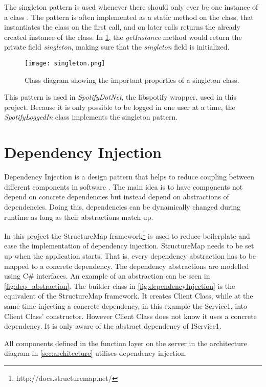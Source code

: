 The singleton pattern is used whenever there should only ever be one
instance of a class \cite{skeet2013c}. The pattern is often implemented as a static
method on the class, that instantiates the class on the first call,
and on later calls returns the already created instance of the class. In
\cref{fig:singleton}, the \textit{getInstance} method would return the private field
\textit{singleton}, making sure that the \textit{singleton} field is initialized.

\begin{figure}[hbtp]
  \centering
  \texttt{[image: singleton.png]}
  \caption{Class diagram showing the important properties of a
    singleton class.}\label{fig:singleton}
\end{figure}

This pattern is used in \textit{SpotifyDotNet}, the libspotify wrapper, used in
this project. Because it is only possible to be logged in one user at
a time, the \textit{SpotifyLoggedIn} class implements the singleton pattern.

\section{Dependency Injection}

Dependency Injection is a design pattern that helps to reduce coupling
between different components in software \cite{injection}. The main idea is
to have components not depend on concrete dependencies but instead
depend on abstractions of dependencies. Doing this, dependencies can
be dynamically changed during runtime as long as their abstractions
match up.

In this project the StructureMap framework\footnote{http://docs.structuremap.net/} is used to reduce
boilerplate and ease the implementation of dependency
injection. StructureMap needs to be set up when the application
starts. That is, every dependency abstraction has to be mapped to a
concrete dependency. The dependency abstractions are modelled using
C\# interfaces. An example of an abstraction can be seen in
\cref{fig:dep_abstraction}. The
builder class in \cref{fig:dependencyInjection} is the equivalent of the StructureMap
framework. It creates Client Class, while at the same time injecting a
concrete dependency, in this example the Service1, into Client Class' constructor. However Client
Class does not know it uses a concrete dependency. It is only aware of
the abstract dependency of IService1.

All components defined in the function layer on the server in the
architecture diagram in \cref{sec:architecture} utilises dependency injection.

